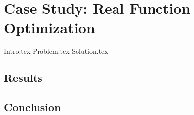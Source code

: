 \chapter{Case Study: Real Function Optimization}
\label{chap:fn_opt}
  {Intro.tex}
  {Problem.tex}
  {Solution.tex}
  
  \section{Results}
  \label{sec:fn_opt:results}
    \Blindtext
  \section{Conclusion}
  \label{sec:fn_opt:conclusion}
    \Blindtext
